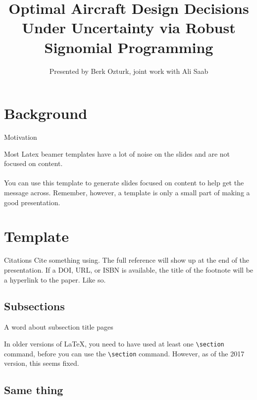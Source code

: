 \documentclass[unknownkeysallowed,aspectratio=43,10pt,onlymath]{beamer}
\title{Optimal Aircraft Design Decisions Under Uncertainty via Robust Signomial Programming}
\author{Presented by Berk Ozturk, joint work with Ali Saab}
\institute{MIT \\ May 3, 2019}
\begin{document}
{%
\begin{frame}[t]\titlepage\end{frame}%
\addtocounter{framenumber}{-1}}

\section*{Background} %

\begin{frame}{Motivation}

Most Latex beamer templates have a lot of noise on the slides and are not focused on content.\\ \ \\

You can use this template to generate slides focused on content to help get the message across.
Remember, however, a template is only a small part of making a good presentation.

\end{frame}

\section{Template}

\begin{frame}{Citations}
Cite something using.
The full reference will show up at the end of the presentation.
If a DOI, URL, or ISBN is available, the title of the footnote will be a hyperlink to the paper. Like so.

\end{frame}

\subsection{Subsections}

\begin{frame}{A word about subsection title pages}

In older versions of \LaTeX{}, you need to have used at least one \texttt{\textbackslash section} command, before you can use the \texttt{\textbackslash section} command.
However, as of the 2017 version, this seems fixed.

\end{frame}

\subsection*{Same thing} %
\end{document}
